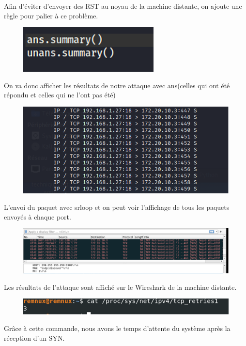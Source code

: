 \documentclass[12pt, oneside]{article}
\begin{document}
Afin d’éviter d’envoyer des RST au noyau de la machine distante, on ajoute une règle pour palier à ce problème.
\begin{figure}[H]
\centering
\includegraphics[scale=0.7]{4}
\end{figure}
On va donc afficher les résultats de notre attaque avec ans(celles qui ont été répondu et celles qui ne l’ont pas été)
\begin{figure}[H]
\centering
\includegraphics[scale=0.7]{5}
\end{figure}
L’envoi du paquet avec srloop et on peut voir l’affichage de tous les paquets envoyés à chaque port.
\begin{figure}[H]
\centering
\includegraphics[scale=0.7]{6}
\end{figure}
Les résultats de l’attaque sont affiché sur le Wireshark de la machine distante.
\begin{figure}[H]
\centering
\includegraphics[scale=0.7]{7}
\end{figure}
Grâce à cette commande, nous avons le temps d’attente du système après la réception d’un SYN.
\end{document}
